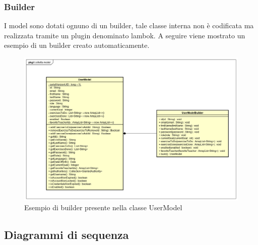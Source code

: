 \subsubsection{Builder}
I model sono dotati ognuno di un builder, tale classe interna non è codificata ma realizzata tramite un plugin denominato lambok. A seguire viene mostrato un esempio di un builder creato automaticamente.
\begin{figure}[H]
\centering
\includegraphics[width=15cm]{img/builder.png}
\caption{Esempio di builder presente nella classe UserModel}
\end{figure}



\subsection{Diagrammi di sequenza}



